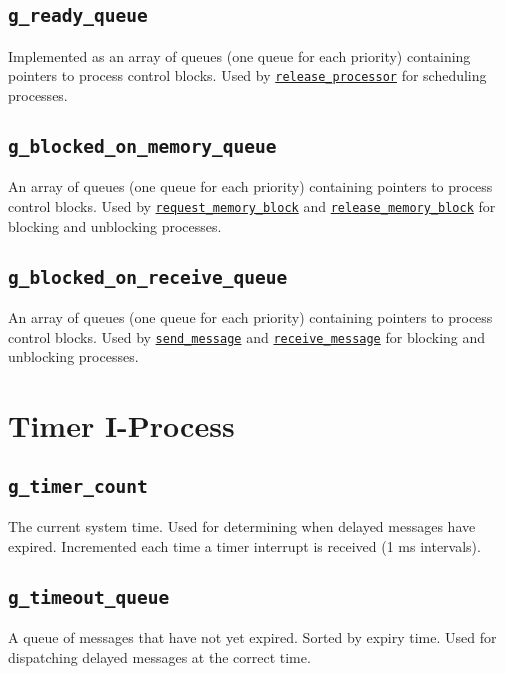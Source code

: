 \documentclass[12pt]{report}
\begin{document}
\subsection{\texttt{g_ready_queue}}

Implemented as an array of queues (one queue for each priority) containing pointers to process control blocks. Used by \hyperref[alg:releasingtheprocessor]{\texttt{release_processor}} for scheduling processes.

\subsection{\texttt{g_blocked_on_memory_queue}}

An array of queues (one queue for each priority) containing pointers to process control blocks. Used by \hyperref[alg:requestingmemoryblocks]{\texttt{request_memory_block}} and \hyperref[alg:releasingmemoryblocks]{\texttt{release_memory_block}} for blocking and unblocking processes.

\subsection{\texttt{g_blocked_on_receive_queue}}

An array of queues (one queue for each priority) containing pointers to process control blocks. Used by \hyperref[alg:sendingmessages]{\texttt{send_message}} and \hyperref[alg:receivingmessages]{\texttt{receive_message}} for blocking and unblocking processes.

\section{Timer I-Process}

\subsection{\texttt{g_timer_count}}
\label{app:gtimercount}

The current system time. Used for determining when delayed messages have expired. Incremented each time a timer interrupt is received (1 ms intervals).

\subsection{\texttt{g_timeout_queue}}
\label{app:gtimeoutqueue}

A queue of messages that have not yet expired. Sorted by expiry time. Used for dispatching delayed messages at the correct time.
\end{document}
